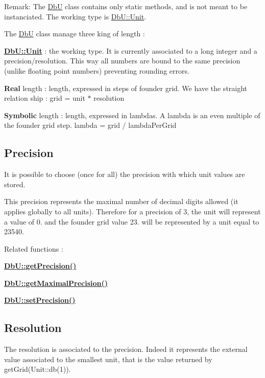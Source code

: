 \begin{DoxyParagraph}{Remark\+:}
The \hyperlink{classHurricane_1_1DbU}{DbU} class contains only static methods, and is not meant to be instanciated. The working type is \hyperlink{group__DbUGroup_ga4fbfa3e8c89347af76c9628ea06c4146}{Db\+U\+::\+Unit}.
\end{DoxyParagraph}
The \hyperlink{classHurricane_1_1DbU}{DbU} class manage three king of length \+: 
\begin{DoxyItemize}
\item {\bfseries \hyperlink{group__DbUGroup_ga4fbfa3e8c89347af76c9628ea06c4146}{Db\+U\+::\+Unit}} \+: the working type. It is currently associated to a long integer and a precision/resolution. This way all numbers are bound to the same precision (unlike floating point numbers) preventing rounding errors. 
\item {\bfseries Real} length \+: length, expressed in steps of founder grid. We have the straight relation ship \+: grid = unit $\ast$ resolution 
\item {\bfseries Symbolic} length \+: length, expressed in lambdas. A lambda is an even multiple of the founder grid step. lambda = grid / lambda\+Per\+Grid 
\end{DoxyItemize}\hypertarget{group__DbUGroup_secDbUPrecision}{}\subsection{Precision}\label{group__DbUGroup_secDbUPrecision}
It is possible to choose (once for all) the precision with which unit values are stored.

This precision represents the maximal number of decimal digits allowed (it applies globally to all units). Therefore for a precision of 3, the unit will represent a value of 0. and the founder grid value 23. will be represented by a unit equal to 23540.

Related functions \+: 
\begin{DoxyItemize}
\item {\bfseries \hyperlink{group__DbUGroup_ga6169efbdd9b3d54a0bd8467c8f957fda}{Db\+U\+::get\+Precision()}} 
\item {\bfseries \hyperlink{group__DbUGroup_ga8756c9f0a32af5f601cd150e73b02c03}{Db\+U\+::get\+Maximal\+Precision()}} 
\item {\bfseries \hyperlink{group__DbUGroup_gace9a8644e7e80dcaed2a8a95deeb1622}{Db\+U\+::set\+Precision()}} 
\end{DoxyItemize}\hypertarget{group__DbUGroup_secDbUResolution}{}\subsection{Resolution}\label{group__DbUGroup_secDbUResolution}
The resolution is associated to the precision. Indeed it represents the external value associated to the smallest unit, that is the value returned by get\+Grid(\+Unit\+::db(1)).

